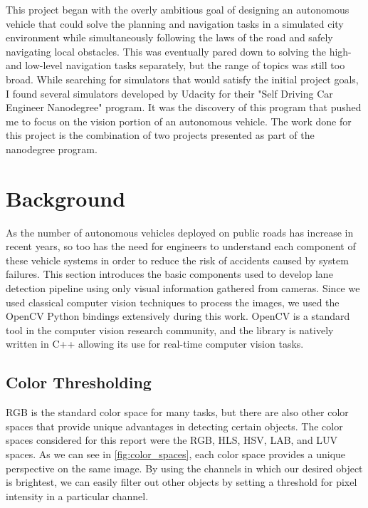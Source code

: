 \documentclass[conf]{new-aiaa}
\begin{document}
This project began with the overly ambitious goal of designing an autonomous vehicle that could solve the planning and navigation tasks in a simulated city environment while simultaneously following the laws of the road and safely navigating local obstacles.  This was eventually pared down to solving the high- and low-level navigation tasks separately, but the range of topics was still too broad.  While searching for simulators that would satisfy the initial project goals, I found several simulators developed by Udacity for their "Self Driving Car Engineer Nanodegree" program.  It was the discovery of this program that pushed me to focus on the vision portion of an autonomous vehicle.  The work done for this project is the combination of two projects presented as part of the nanodegree program.

\section{Background}
\label{section: background}
As the number of autonomous vehicles deployed on public roads has increase in recent years, so too has the need for engineers to understand each component of these vehicle systems in order to reduce the risk of accidents caused by system failures.  This section introduces the basic components used to develop lane detection pipeline using only visual information gathered from cameras.  Since we used classical computer vision techniques to process the images, we used the OpenCV Python bindings extensively during this work.  OpenCV is a standard tool in the computer vision research community, and the library is natively written in C++ allowing its use for real-time computer vision tasks.

\subsection{Color Thresholding}
RGB is the standard color space for many tasks, but there are also other color spaces that provide unique advantages in detecting certain objects.  The color spaces considered for this report were the RGB, HLS, HSV, LAB, and LUV spaces. As we can see in \ref{fig:color_spaces}, each color space provides a unique perspective on the same image.  By using the channels in which our desired object is brightest, we can easily filter out other objects by setting a threshold for pixel intensity in a particular channel.
\end{document}
